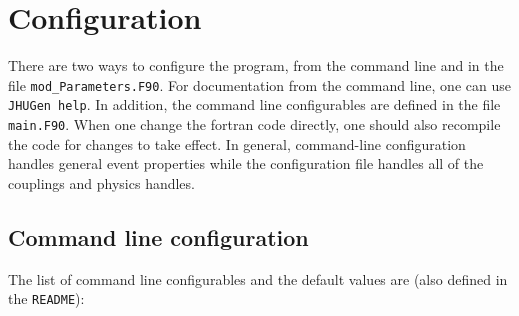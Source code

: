 \documentclass[aps,superscriptaddress,nofootinbib]{revtex4}
\begin{document}
\section{ Configuration }

There are two ways to configure the program, from the command line and in the file \verb|mod_Parameters.F90|.  For documentation from the command line, one can use \verb|JHUGen help|.  In addition, the command line configurables are defined in the file \verb|main.F90|.  When one change the fortran code directly, one should also recompile the code for changes to take effect.  In general, command-line configuration handles general event properties while the configuration file handles all of the couplings and physics handles.

\subsection{ Command line configuration }

The list of command line configurables and the default values are (also defined in the \verb|README|):
\end{document}
